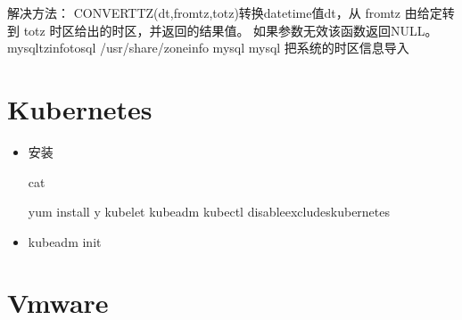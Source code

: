 \documentclass[a4paper,10pt,english]{sphinxmanual}
\begin{document}
\begin{itemize}
\begin{sphinxVerbatim}[commandchars=\\\{\}]
解决方法：
CONVERT\PYGZus{}TZ(dt,from\PYGZus{}tz,to\PYGZus{}tz)转换datetime值dt，从 from\PYGZus{}tz 由给定转到 to\PYGZus{}tz 时区给出的时区，并返回的结果值。 如果参数无效该函数返回NULL。
mysql\PYGZus{}tzinfo\PYGZus{}to\PYGZus{}sql  /usr/share/zoneinfo \textbar{} mysql mysql  把系统的时区信息导入
\end{sphinxVerbatim}

\end{itemize}


\chapter{Kubernetes}
\label{\detokenize{linux/kubernetes:kubernetes}}\label{\detokenize{linux/kubernetes::doc}}\begin{itemize}
\item {} 
安装

\begin{sphinxVerbatim}[commandchars=\\\{\}]
cat 

yum install \PYGZhy{}y kubelet kubeadm kubectl \PYGZhy{}\PYGZhy{}disableexcludeskubernetes
\end{sphinxVerbatim}

\item {} 
kubeadm init

\end{itemize}


\chapter{Vmware}
\label{\detokenize{vmware/index:vmware}}\label{\detokenize{vmware/index::doc}}
\end{document}
